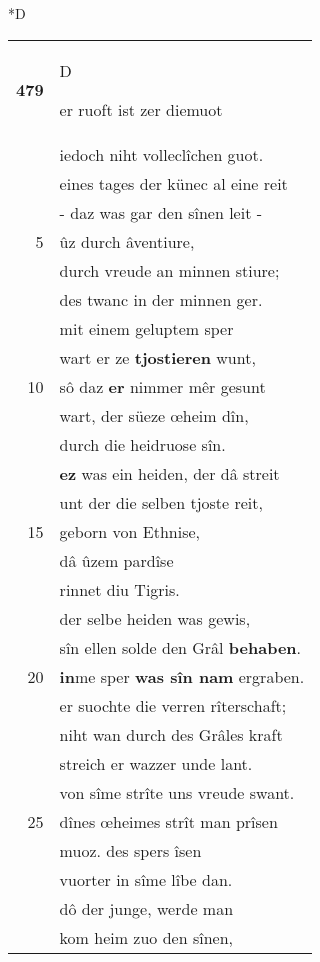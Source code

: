 \documentclass[8pt,a4paper,notitlepage]{article}
\begin{document}
\begin{table}[ht]
\begin{minipage}[t]{0.5\linewidth}
\small
\begin{center}*D
\end{center}
\begin{tabular}{rl}
\textbf{479} & \begin{large}D\end{large}er ruoft ist zer diemuot\\ 
 & iedoch niht volleclîchen guot.\\ 
 & eines tages der künec al eine reit\\ 
 & - daz was gar den sînen leit -\\ 
5 & ûz durch âventiure,\\ 
 & durch vreude an minnen stiure;\\ 
 & des twanc in der minnen ger.\\ 
 & mit einem geluptem sper\\ 
 & wart er ze \textbf{tjostieren} wunt,\\ 
10 & sô daz \textbf{er} nimmer mêr gesunt\\ 
 & wart, der süeze œheim dîn,\\ 
 & durch die heidruose sîn.\\ 
 & \textbf{ez} was ein heiden, der dâ streit\\ 
 & unt der die selben tjoste reit,\\ 
15 & geborn von Ethnise,\\ 
 & dâ ûzem pardîse\\ 
 & rinnet diu Tigris.\\ 
 & der selbe heiden was gewis,\\ 
 & sîn ellen solde den Grâl \textbf{behaben}.\\ 
20 & \textbf{in}me sper \textbf{was sîn nam} ergraben.\\ 
 & er suochte die verren rîterschaft;\\ 
 & niht wan durch des Grâles kraft\\ 
 & streich er wazzer unde lant.\\ 
 & von sîme strîte uns vreude swant.\\ 
25 & dînes œheimes strît man prîsen\\ 
 & muoz. des spers îsen\\ 
 & vuorter in sîme lîbe dan.\\ 
 & dô der junge, werde man\\ 
 & kom heim zuo den sînen,\\ 

\end{tabular}
\end{minipage}
\end{table}
\end{document}

